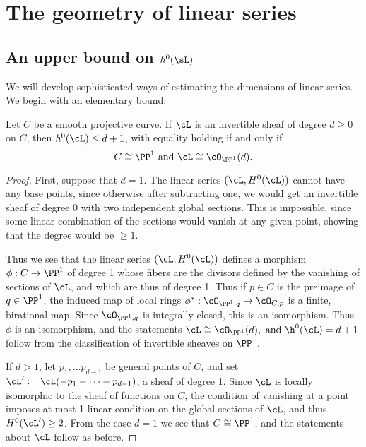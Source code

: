 \section{The geometry of linear series}

\subsection{An upper bound on $h^0(\sL)$}

We will develop sophisticated ways of estimating the dimensions of linear series. We begin with an elementary bound:

\begin{theorem}\label{characterization of P1}
Let $C$ be a smooth projective curve. If $\cL$ is an invertible sheaf of degree $d\geq 0$ on $C$, then $h^0(\cL)\leq d+1$, with equality holding if and only if
$$
C \cong \PP^1  \text{ and  }  \cL \cong \cO_{\PP^1}(d).
$$
\end{theorem}

\begin{proof}
First, suppose that $d=1$. The linear series $(\cL, H^0(\cL))$ cannot have any base points, since
otherwise after subtracting one, we would get an invertible sheaf of degree $0$ with two independent global sections. This is impossible, since some linear combination of the sections would vanish at any given point, showing that the degree would be
$\geq 1$.

Thus we see that the linear series $(\cL, H^0(\cL))$ defines a morphism $\phi: C\to \PP^1$ of degree 1 whose fibers are the divisors defined by
the vanishing of sections of $\cL$, and which are thus of degree 1. Thus if $p\in C$ is the preimage of $q\in \PP^1$, the induced map of local rings
$\phi^*:\cO_{\PP^1, q} \to \cO_{C, p}$ is a finite, birational map. Since $\cO_{\PP^1, q}$ is integrally closed, this is an isomorphism. Thus 
$\phi$ is an isomorphism, and the statements $\cL \cong \cO_{\PP^1}(d), \hbox{ and  } \h^0(\cL) = d+1$ follow from the classification of invertible sheaves on $\PP^1$. 

If $d>1$, let $p_1,\dots p_{d-1}$ be general points of $C$, and set $\cL':=\cL(-p_1-\cdots-p_{d-1})$, a sheaf of degree 1.
 Since $\cL$ is locally isomorphic to the sheaf of functions on $C$, the condition of vanishing at a point imposes at most 1 linear condition on 
the global sections of $\cL$, and thus $H^0(\cL') \geq 2$. From the case $d=1$ we see that $C\cong \PP^1$, and the statements
about $\cL$ follow as before.
 \end{proof}

